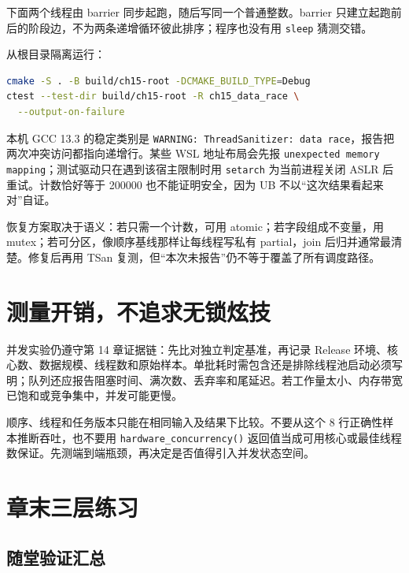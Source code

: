 下面两个线程由 barrier 同步起跑，随后写同一个普通整数。barrier 只建立起跑前后的阶段边，不为两条递增循环彼此排序；程序也没有用 \texttt{sleep} 猜测交错。



从根目录隔离运行：

\begin{lstlisting}[language=bash,numbers=none]
cmake -S . -B build/ch15-root -DCMAKE_BUILD_TYPE=Debug
ctest --test-dir build/ch15-root -R ch15_data_race \
  --output-on-failure
\end{lstlisting}

本机 GCC 13.3 的稳定类别是 \texttt{WARNING: ThreadSanitizer: data race}，报告把两次冲突访问都指向递增行。某些 WSL 地址布局会先报 \texttt{unexpected memory mapping}；测试驱动只在遇到该宿主限制时用 \texttt{setarch} 为当前进程关闭 ASLR 后重试。计数恰好等于 200000 也不能证明安全，因为 UB 不以“这次结果看起来对”自证。

恢复方案取决于语义：若只需一个计数，可用 atomic；若字段组成不变量，用 mutex；若可分区，像顺序基线那样让每线程写私有 partial，join 后归并通常最清楚。修复后再用 TSan 复测，但“本次未报告”仍不等于覆盖了所有调度路径。

\section{测量开销，不追求无锁炫技}

并发实验仍遵守第 14 章证据链：先比对独立判定基准，再记录 Release 环境、核心数、数据规模、线程数和原始样本。单批耗时需包含还是排除线程池启动必须写明；队列还应报告阻塞时间、满次数、丢弃率和尾延迟。若工作量太小、内存带宽已饱和或竞争集中，并发可能更慢。

顺序、线程和任务版本只能在相同输入及结果下比较。不要从这个 8 行正确性样本推断吞吐，也不要用 \texttt{hardware\_concurrency()} 返回值当成可用核心或最佳线程数保证。先测端到端瓶颈，再决定是否值得引入并发状态空间。

\section{章末三层练习}

\subsection*{随堂验证汇总}

